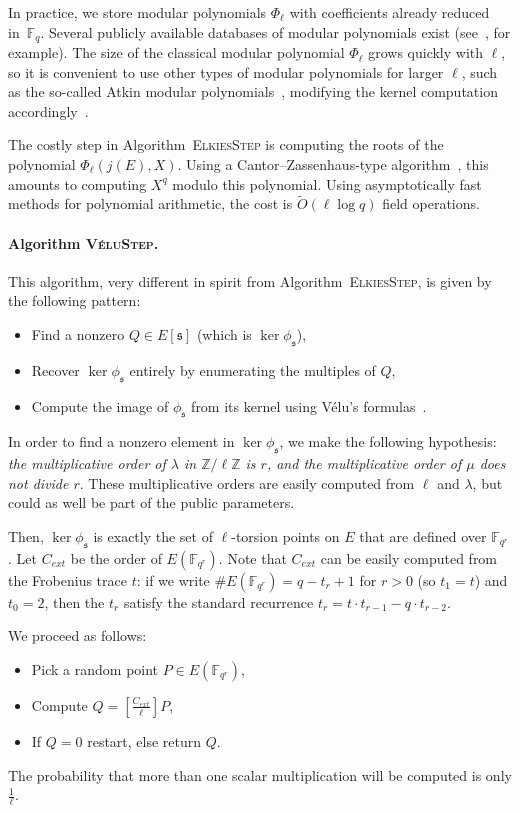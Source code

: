 \documentclass{llncs}
\newcommand{\F}{\mathbb{F}}
\newcommand{\Z}{\mathbb{Z}}
\newcommand{\softO}{\tilde{O}}
\newcommand{\algstyle}[1]{\textsc{#1}}
\renewcommand{\frak}{\mathfrak}
\begin{document}
In practice, we store modular polynomials $\Phi_\ell$
with coefficients already reduced in~$\F_q$. 
Several publicly available databases of modular polynomials
exist (see~\cite{Echidna}, for example).
The size of the classical modular polynomial
$\Phi_\ell$ grows quickly with $\ell$, so it is convenient
to use other types of modular polynomials for larger $\ell$,
such as the so-called Atkin modular polynomials~\cite{Elkies98}, 
modifying the kernel computation accordingly~\cite{Morain95}.

The costly step in Algorithm~\algstyle{ElkiesStep} is computing the roots
of the polynomial $\Phi_\ell(j(E), X)$. Using a Cantor--Zassenhaus-type
algorithm~\cite{todo:canzass}, this amounts to computing $X^q$ modulo
this polynomial. Using asymptotically fast methods for polynomial
arithmetic, the cost is $\softO(\ell\log q)$ field operations.

\paragraph{Algorithm \algstyle{VéluStep}.} This algorithm, very different
in spirit from Algorithm~\algstyle{ElkiesStep}, is given by the following
pattern:
\begin{itemize}
\item Find a nonzero $Q\in E[\frak s]$ (which is $\ker \phi_{\frak s}$),
\item Recover $\ker \phi_{\frak s}$ entirely by enumerating the multiples of $Q$,
\item Compute the image of $\phi_{\frak s}$ from its kernel using
    Vélu's formulas~\cite{Velu71}.
\end{itemize}
In order to find a nonzero element in $\ker\phi_{\frak s}$, we make the
following hypothesis: \emph{the multiplicative order of $\lambda$ in
$\Z/\ell\Z$ is $r$, and the multiplicative order of $\mu$ does not
divide $r$}. These multiplicative orders are easily computed
from $\ell$ and $\lambda$, but could as well be part of the public
parameters.

Then, $\ker\phi_{\frak s}$ is exactly the set of $\ell$-torsion
points on $E$ that are defined over $\F_{q^r}$. 
Let $C_{ext}$ be the order of $E(\F_{q^r})$.
Note that $C_{ext}$ can be easily computed from the Frobenius trace $t$:
if we write $\#E(\F_{q^r}) = q - t_r + 1$ for 
$r > 0$ (so $t_1 = t$) and $t_0 = 2$,
then the $t_r$ satisfy the standard recurrence
$t_r = t\cdot t_{r-1} - q\cdot t_{r-2}$. 

We proceed as follows:
\begin{itemize}
\item Pick a random point $P\in E(\F_{q^r})$,
\item Compute $Q = \left[\frac{C_{ext}}{\ell}\right]P$,
\item If $Q = 0$ restart, else return $Q$.
\end{itemize}
The probability that more than one scalar multiplication will be computed
is only $\frac{1}{\ell}$.
\end{document}
